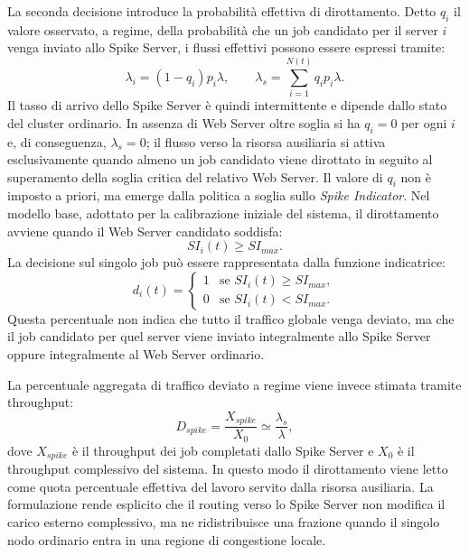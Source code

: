 ﻿\documentclass[a4paper,12pt]{article}
\begin{document}
La seconda decisione introduce la probabilità effettiva di dirottamento. Detto $q_i$ il valore osservato, a regime, della probabilità che un job candidato per il server $i$ venga inviato allo Spike Server, i flussi effettivi possono essere espressi tramite:
\begin{equation}
    \lambda_i = (1-q_i)p_i\lambda,
    \qquad
    \lambda_s = \sum_{i=1}^{N(t)} q_i p_i \lambda.
\end{equation}
Il tasso di arrivo dello Spike Server è quindi intermittente e dipende dallo stato del cluster ordinario. In assenza di Web Server oltre soglia si ha $q_i=0$ per ogni $i$ e, di conseguenza, $\lambda_s=0$; il flusso verso la risorsa ausiliaria si attiva esclusivamente quando almeno un job candidato viene dirottato in seguito al superamento della soglia critica del relativo Web Server.
Il valore di $q_i$ non è imposto a priori, ma emerge dalla politica a soglia sullo \textit{Spike Indicator}. Nel modello base, adottato per la calibrazione iniziale del sistema, il dirottamento avviene quando il Web Server candidato soddisfa:
\begin{equation}
    SI_i(t) \ge SI_{max}.
\end{equation}
La decisione sul singolo job può essere rappresentata dalla funzione indicatrice:
\begin{equation}
    d_i(t)=
    \begin{cases}
        1 & \text{se } SI_i(t)\ge SI_{max},\\
        0 & \text{se } SI_i(t)<SI_{max}.
    \end{cases}
\end{equation}
Questa percentuale non indica che tutto il traffico globale venga deviato, ma che il job candidato per quel server viene inviato integralmente allo Spike Server oppure integralmente al Web Server ordinario. 

La percentuale aggregata di traffico deviato a regime viene invece stimata tramite throughput:
\begin{equation}
    D_{spike} = \frac{X_{spike}}{X_0}
    \simeq
    \frac{\lambda_s}{\lambda},
\end{equation}
dove $X_{spike}$ è il throughput dei job completati dallo Spike Server e $X_0$ è il throughput complessivo del sistema. In questo modo il dirottamento viene letto come quota percentuale effettiva del lavoro servito dalla risorsa ausiliaria. La formulazione rende esplicito che il routing verso lo Spike Server non modifica il carico esterno complessivo, ma ne ridistribuisce una frazione quando il singolo nodo ordinario entra in una regione di congestione locale.
\end{document}

